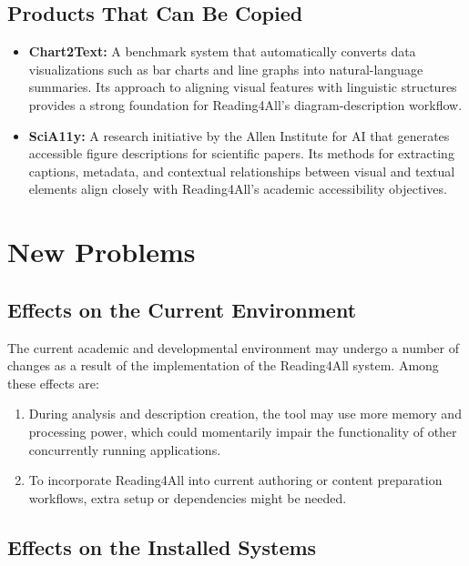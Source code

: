 \documentclass[12pt]{article}
\begin{document}
\subsection{Products That Can Be Copied}

\begin{itemize}
  \item \textbf{Chart2Text:} A benchmark system that automatically
    converts data visualizations such as bar charts and line graphs
    into natural-language summaries. Its approach to aligning visual
    features with linguistic structures provides a strong foundation
    for Reading4All’s diagram-description workflow.

  \item \textbf{SciA11y:} A research initiative by the Allen
    Institute for AI that generates accessible figure descriptions
    for scientific papers. Its methods for extracting captions,
    metadata, and contextual relationships between visual and textual
    elements align closely with Reading4All’s academic accessibility objectives.
\end{itemize}

\section{New Problems}

\subsection{Effects on the Current Environment}

The current academic and developmental environment may undergo a number of changes as a result of the implementation of the Reading4All system. Among these effects are:

\begin{enumerate}
    \item During analysis and description creation, the tool may use more memory and processing power, which could momentarily impair the functionality of other concurrently running applications.
    \item To incorporate Reading4All into current authoring or content preparation workflows, extra setup or dependencies might be needed.
\end{enumerate}

\subsection{Effects on the Installed Systems}
\end{document}
